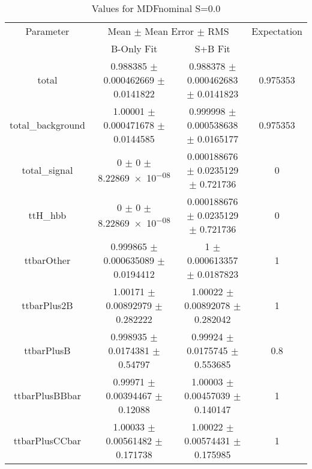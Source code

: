 \begin{table}
\centering
\caption{Values for MDFnominal S=0.0}
\begin{tabular}{cccc}
\toprule
Parameter & \multicolumn{2}{c}{Mean $\pm$ Mean Error $\pm$ RMS} & Expectation\\
 & B-Only Fit & S+B Fit & \\
\midrule
total & \num{0.988385} $\pm$ \num{0.000462669} $\pm$ \num{0.0141822} & \num{0.988378} $\pm$ \num{0.000462683} $\pm$ \num{0.0141823} & \num{0.975353}\\
total\_background & \num{1.00001} $\pm$ \num{0.000471678} $\pm$ \num{0.0144585} & \num{0.999998} $\pm$ \num{0.000538638} $\pm$ \num{0.0165177} & \num{0.975353}\\
total\_signal & \num{0} $\pm$ \num{0} $\pm$ \num{8.22869e-08} & \num{0.000188676} $\pm$ \num{0.0235129} $\pm$ \num{0.721736} & \num{0}\\
ttH\_hbb & \num{0} $\pm$ \num{0} $\pm$ \num{8.22869e-08} & \num{0.000188676} $\pm$ \num{0.0235129} $\pm$ \num{0.721736} & \num{0}\\
ttbarOther & \num{0.999865} $\pm$ \num{0.000635089} $\pm$ \num{0.0194412} & \num{1} $\pm$ \num{0.000613357} $\pm$ \num{0.0187823} & \num{1}\\
ttbarPlus2B & \num{1.00171} $\pm$ \num{0.00892979} $\pm$ \num{0.282222} & \num{1.00022} $\pm$ \num{0.00892078} $\pm$ \num{0.282042} & \num{1}\\
ttbarPlusB & \num{0.998935} $\pm$ \num{0.0174381} $\pm$ \num{0.54797} & \num{0.99924} $\pm$ \num{0.0175745} $\pm$ \num{0.553685} & \num{0.8}\\
ttbarPlusBBbar & \num{0.99971} $\pm$ \num{0.00394467} $\pm$ \num{0.12088} & \num{1.00003} $\pm$ \num{0.00457039} $\pm$ \num{0.140147} & \num{1}\\
ttbarPlusCCbar & \num{1.00033} $\pm$ \num{0.00561482} $\pm$ \num{0.171738} & \num{1.00022} $\pm$ \num{0.00574431} $\pm$ \num{0.175985} & \num{1}\\
\bottomrule
\end{tabular}
\end{table}
